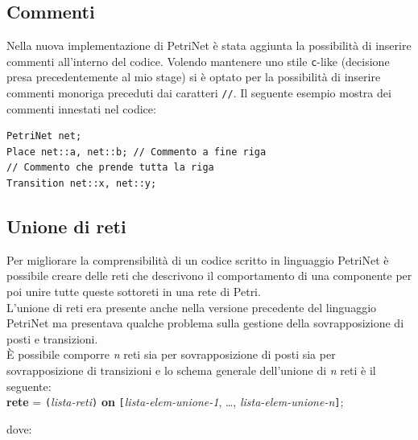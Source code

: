 \documentclass[italian,12pt]{book}
\begin{document}
\subsection{Commenti}\label{ssect:new_commenti}
Nella nuova implementazione di PetriNet è stata aggiunta la possibilità di inserire commenti all'interno del 
codice. Volendo mantenere uno stile {\tt c}-like (decisione presa precedentemente al mio stage) si è optato 
per la possibilità di inserire commenti monoriga preceduti dai caratteri {\tt //}. Il seguente esempio mostra 
dei commenti innestati nel codice:
\begin{verbatim}PetriNet net;
Place net::a, net::b; // Commento a fine riga
// Commento che prende tutta la riga
Transition net::x, net::y;
\end{verbatim}

\subsection{Unione di reti}\label{subsect:unione_di_reti}
Per migliorare la comprensibilità di un codice scritto in linguaggio PetriNet è possibile creare delle reti che descrivono il comportamento di una componente per poi unire tutte queste sottoreti in una rete di Petri.\\
L'unione di reti era presente anche nella versione precedente del linguaggio PetriNet ma presentava qualche problema sulla gestione della sovrapposizione di posti e transizioni.\\
È possibile comporre \emph{n} reti sia per sovrapposizione di posti sia per sovrapposizione di transizioni e lo schema generale dell'unione di \emph{n} reti è il seguente:\\

{\small 
{\bf rete}  = {\tt(}\emph{lista-reti}{\tt)} {\bf on}
{\tt[}\emph{lista-elem-unione-1},
\dots, \emph{lista-elem-unione-n}{\tt]};\\
}

dove:\\
\end{document}
